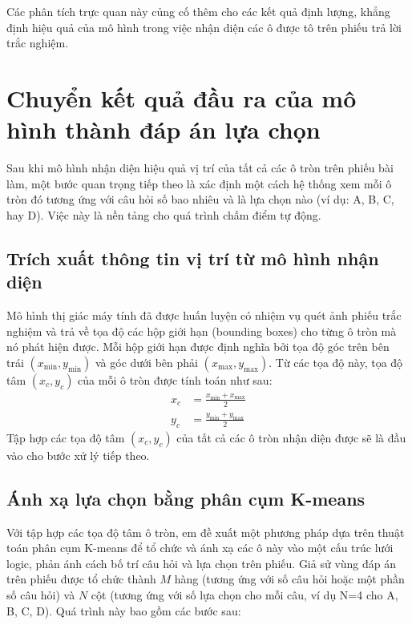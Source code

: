 Các phân tích trực quan này củng cố thêm cho các kết quả định lượng, khẳng định hiệu quả của mô hình trong việc nhận diện các ô được tô trên phiếu trả lời trắc nghiệm.
\section{Chuyển kết quả đầu ra của mô hình thành đáp án lựa chọn}
\label{sec:ung_dung_anh_xa}

Sau khi mô hình nhận diện hiệu quả vị trí của tất cả các ô tròn trên phiếu bài làm, một bước quan trọng tiếp theo là xác định một cách hệ thống xem mỗi ô tròn đó tương ứng với câu hỏi số bao nhiêu và là lựa chọn nào (ví dụ: A, B, C, hay D). Việc này là nền tảng cho quá trình chấm điểm tự động.

\subsection{Trích xuất thông tin vị trí từ mô hình nhận diện}
\label{ssec:trich_xuat_vi_tri}
Mô hình thị giác máy tính đã được huấn luyện có nhiệm vụ quét ảnh phiếu trắc nghiệm và trả về tọa độ các hộp giới hạn (bounding boxes) cho từng ô tròn mà nó phát hiện được. Mỗi hộp giới hạn được định nghĩa bởi tọa độ góc trên bên trái $(x_{\min}, y_{\min})$ và góc dưới bên phải $(x_{\max}, y_{\max})$. Từ các tọa độ này, tọa độ tâm $(x_c, y_c)$ của mỗi ô tròn được tính toán như sau:
\begin{align}
    x_c &= \frac{x_{\min} + x_{\max}}{2} \\
    y_c &= \frac{y_{\min} + y_{\max}}{2}
\end{align}
Tập hợp các tọa độ tâm $(x_c, y_c)$ của tất cả các ô tròn nhận diện được sẽ là đầu vào cho bước xử lý tiếp theo.

\subsection{Ánh xạ lựa chọn bằng phân cụm K-means}
\label{ssec:kmeans_mapping_focused}

Với tập hợp các tọa độ tâm ô tròn, em đề xuất một phương pháp dựa trên thuật toán phân cụm K-means để tổ chức và ánh xạ các ô này vào một cấu trúc lưới logic, phản ánh cách bố trí câu hỏi và lựa chọn trên phiếu. Giả sử vùng đáp án trên phiếu được tổ chức thành $M$ hàng (tương ứng với số câu hỏi hoặc một phần số câu hỏi) và $N$ cột (tương ứng với số lựa chọn cho mỗi câu, ví dụ N=4 cho A, B, C, D). Quá trình này bao gồm các bước sau:

